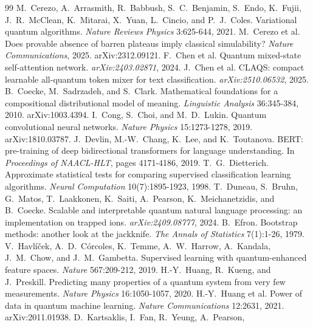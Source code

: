 \documentclass[10pt]{article}
\begin{document}
\begin{thebibliography}{99}
 M.~Cerezo, A.~Arrasmith, R.~Babbush, S.~C.~Benjamin,
S.~Endo, K.~Fujii, J.~R.~McClean, K.~Mitarai, X.~Yuan, L.~Cincio, and P.~J.~Coles. Variational
quantum algorithms. \emph{Nature Reviews Physics} 3:625-644, 2021.
 M.~Cerezo et al. Does provable absence of barren plateaus
imply classical simulability? \emph{Nature Communications}, 2025. arXiv:2312.09121.
 F.~Chen et al. Quantum mixed-state self-attention network.
\emph{arXiv:2403.02871}, 2024.
 J.~Chen et al. CLAQS: compact learnable all-quantum token mixer
for text classification. \emph{arXiv:2510.06532}, 2025.
 B.~Coecke, M.~Sadrzadeh, and S.~Clark. Mathematical
foundations for a compositional distributional model of meaning. \emph{Linguistic Analysis}
36:345-384, 2010. arXiv:1003.4394.
 I.~Cong, S.~Choi, and M.~D.~Lukin. Quantum convolutional
neural networks. \emph{Nature Physics} 15:1273-1278, 2019. arXiv:1810.03787.
 J.~Devlin, M.-W.~Chang, K.~Lee, and K.~Toutanova. BERT:
pre-training of deep bidirectional transformers for language understanding. In \emph{Proceedings of
NAACL-HLT}, pages 4171-4186, 2019.
 T.~G.~Dietterich. Approximate statistical tests for
comparing supervised classification learning algorithms. \emph{Neural Computation} 10(7):1895-1923,
1998.
 T.~Duneau, S.~Bruhn, G.~Matos, T.~Laakkonen, K.~Saiti,
A.~Pearson, K.~Meichanetzidis, and B.~Coecke. Scalable and interpretable quantum natural language
processing: an implementation on trapped ions. \emph{arXiv:2409.08777}, 2024.
 B.~Efron. Bootstrap methods: another look at the jackknife.
\emph{The Annals of Statistics} 7(1):1-26, 1979.
 V.~Havl\'i\v{c}ek, A.~D.~C\'orcoles, K.~Temme,
A.~W.~Harrow, A.~Kandala, J.~M.~Chow, and J.~M.~Gambetta. Supervised learning with quantum-enhanced
feature spaces. \emph{Nature} 567:209-212, 2019.
 H.-Y.~Huang, R.~Kueng, and J.~Preskill. Predicting many
properties of a quantum system from very few measurements. \emph{Nature Physics} 16:1050-1057, 2020.
 H.-Y.~Huang et al. Power of data in quantum machine learning.
\emph{Nature Communications} 12:2631, 2021. arXiv:2011.01938.
 D.~Kartsaklis, I.~Fan, R.~Yeung, A.~Pearson,

\end{thebibliography}
\end{document}
